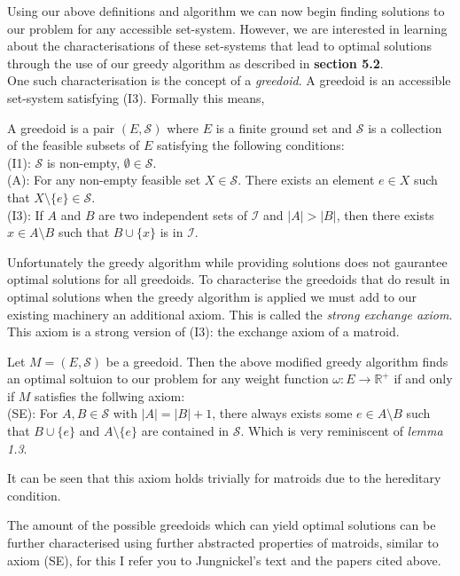 \documentclass[../main.tex]{subfiles}
\begin{document}
\noindent Using our above definitions and algorithm we can now begin finding solutions to our problem for any accessible set-system. However, we are interested in learning about the characterisations of these set-systems that lead to optimal solutions through the use of our greedy algorithm as described in \textbf{section 5.2}.\\
One such characterisation is the concept of a \textit{greedoid}. A greedoid is an accessible set-system satisfying (I3). Formally this means,
\begin{defn}
A greedoid is a pair $(E,\mathcal{S})$ where $E$ is a finite ground set and $\mathcal{S}$ is a collection of the feasible subsets of $E$ satisfying the following conditions:\\
(I1): $\mathcal{S}$ is non-empty, $\emptyset \in \mathcal{S}.$\\
(A):  For any non-empty feasible set $X \in \mathcal{S}.$ There exists an element $e \in X$ such that $X \setminus \{e\} \in \mathcal{S}.$\\
(I3): If $ A $ and $ B $ are two independent sets of $\mathcal{I}$ and $|A|>|B|$, then there exists $x \in A \setminus B$ such that $B \cup \{ x \}$ is in $\mathcal{I}.$
\end{defn}
Unfortunately the greedy algorithm while providing solutions does not gaurantee optimal solutions for all greedoids. To characterise the greedoids that do result in optimal solutions when the greedy algorithm is applied we must add to our existing machinery an additional axiom. This is called the \textit{strong exchange axiom}. This axiom is a strong version of (I3): the exchange axiom of a matroid. 
\begin{prop}
Let $M=(E,\mathcal{S})$ be a greedoid. Then the above modified greedy algorithm  finds an optimal soltuion to our problem for any weight function $\omega:E \longrightarrow \mathbb{R^+}$ if and only if $M$ satisfies the follwing axiom:\\
(SE): For $A,B \in \mathcal{S}$ with $|A|=|B|+1$, there always exists some $e \in A \setminus B$ such that $B \cup \{e\}$ and $A \setminus \{e\}$ are contained in $\mathcal{S}.$ Which is very reminiscent of \textit{lemma 1.3}.
\end{prop}
\begin{rem}
It can be seen that this axiom holds trivially for matroids due to the hereditary condition.
\end{rem}
\begin{rem}
The amount of the possible greedoids which can yield optimal solutions can be further characterised using further abstracted properties of matroids, similar to axiom (SE), for this I refer you to Jungnickel's text\cite{jungnickel} and the papers cited above.
\end{rem}
\end{document}
